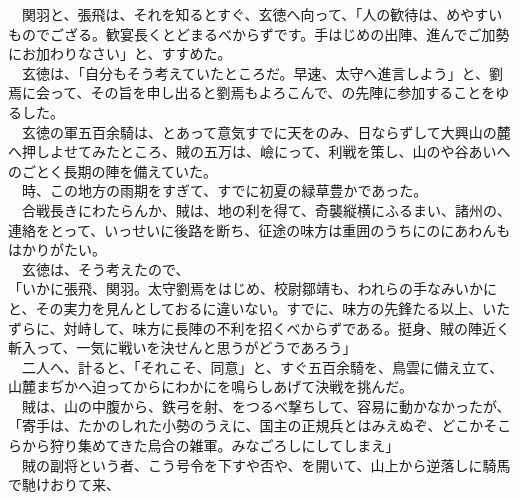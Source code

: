 \documentclass[
  paper=a5,
  fontsize=10pt,
  jafontsize=9.5pt,
  tate,                  %
  open_bracket_pos=nibu, %
]{jlreq}
\begin{document}
　関羽と、張飛は、それを知るとすぐ、玄徳へ向って、「人の歓待は、めやすいものでござる。歓宴長くとどまるべからずです。手はじめの出陣、進んでご加勢にお加わりなさい」と、すすめた。\\


　玄徳は、「自分もそう考えていたところだ。早速、太守へ進言しよう」と、劉焉に会って、その旨を申し出ると劉焉もよろこんで、の先陣に参加することをゆるした。\\


　玄徳の軍五百余騎は、とあって意気すでに天をのみ、日ならずして大興山の麓へ押しよせてみたところ、賊の五万は、嶮にって、利戦を策し、山のや谷あいへのごとく長期の陣を備えていた。\\


　時、この地方の雨期をすぎて、すでに初夏の緑草豊かであった。\\


　合戦長きにわたらんか、賊は、地の利を得て、奇襲縦横にふるまい、諸州の、連絡をとって、いっせいに後路を断ち、征途の味方は重囲のうちにのにあわんもはかりがたい。\\


　玄徳は、そう考えたので、\\


「いかに張飛、関羽。太守劉焉をはじめ、校尉鄒靖も、われらの手なみいかにと、その実力を見んとしておるに違いない。すでに、味方の先鋒たる以上、いたずらに、対峙して、味方に長陣の不利を招くべからずである。挺身、賊の陣近く斬入って、一気に戦いを決せんと思うがどうであろう」\\


　二人へ、計ると、「それこそ、同意」と、すぐ五百余騎を、鳥雲に備え立て、山麓まぢかへ迫ってからにわかにを鳴らしあげて決戦を挑んだ。\\


　賊は、山の中腹から、鉄弓を射、をつるべ撃ちして、容易に動かなかったが、\\


「寄手は、たかのしれた小勢のうえに、国主の正規兵とはみえぬぞ、どこかそこらから狩り集めてきた烏合の雑軍。みなごろしにしてしまえ」\\


　賊の副将という者、こう号令を下すや否や、を開いて、山上から逆落しに騎馬で馳けおりて来、\\
\end{document}
